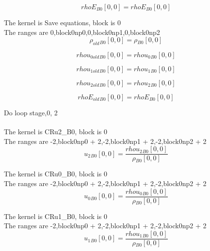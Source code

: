 \documentclass{article}
\begin{document}
\begin{dmath}{rhoE{_{B0}}}[{0,0}] = {rhoE{_{B0}}}[{0,0}]\end{dmath}

\noindent The kernel is Save equations, block is 0\\\noindent The ranges are 0,block0np0,0,block0np1,0,block0np2\\\begin{dmath}{\rho_{old}{_{B0}}}[{0,0}] = {\rho{_{B0}}}[{0,0}]\end{dmath}

\begin{dmath}{rhou_{0 old}{_{B0}}}[{0,0}] = {rhou_{0}{_{B0}}}[{0,0}]\end{dmath}

\begin{dmath}{rhou_{1 old}{_{B0}}}[{0,0}] = {rhou_{1}{_{B0}}}[{0,0}]\end{dmath}

\begin{dmath}{rhou_{2 old}{_{B0}}}[{0,0}] = {rhou_{2}{_{B0}}}[{0,0}]\end{dmath}

\begin{dmath}{rhoE_{old}{_{B0}}}[{0,0}] = {rhoE{_{B0}}}[{0,0}]\end{dmath}

\noindent Do loop stage,0, 2\\
\\\noindent The kernel is CRu2_B0, block is 0\\\noindent The ranges are -2,block0np0 + 2,-2,block0np1 + 2,-2,block0np2 + 2\\\begin{dmath}{u_{2}{_{B0}}}[{0,0}] = \frac{{rhou_{2}{_{B0}}}[{0,0}]}{{\rho{_{B0}}}[{0,0}]}\end{dmath}

\noindent The kernel is CRu0_B0, block is 0\\\noindent The ranges are -2,block0np0 + 2,-2,block0np1 + 2,-2,block0np2 + 2\\\begin{dmath}{u_{0}{_{B0}}}[{0,0}] = \frac{{rhou_{0}{_{B0}}}[{0,0}]}{{\rho{_{B0}}}[{0,0}]}\end{dmath}

\noindent The kernel is CRu1_B0, block is 0\\\noindent The ranges are -2,block0np0 + 2,-2,block0np1 + 2,-2,block0np2 + 2\\\begin{dmath}{u_{1}{_{B0}}}[{0,0}] = \frac{{rhou_{1}{_{B0}}}[{0,0}]}{{\rho{_{B0}}}[{0,0}]}\end{dmath}
\end{document}
